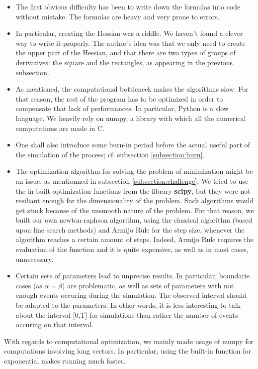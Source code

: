 \begin{itemize}
\item The first obvious difficulty has been to write down the formulas into code without mistake. The formulas are heavy and very prone to errors.
\item In particular, creating the Hessian was a riddle. We haven't found a clever way to write it properly. The author's idea was that we only need to create the upper part of the Hessian, and that there are two types of groups of derivatives: the square and the rectangles, as appearing in the previous subsection.
\item As mentioned, the computational bottleneck makes the algorithms slow. For that reason, the rest of the program has to be optimized in order to compensate that lack of performances. In particular, Python is a slow language. We heavily rely on numpy, a library with which all the numerical computations are made in C.
\item One shall also introduce some burn-in period before the actual useful part of the simulation of the process; cf. subsection \ref{subsection:burn}.
\item The optimization algorithm for solving the problem of minimization might be an issue, as mentionned in subsection \ref{subsection:challenge}. We tried to use the in-built optimization functions from the library \textbf{scipy}, but they were not resiliant enough for the dimensionality of the problem. Such algorithms would get stuck because of the unsmooth nature of the problem. For that reason, we built our own newton-raphson algorithm, using the classical algorithm (based upon line search methods) and Armijo Rule for the step size, whenever the algorithm reaches a certain amount of steps. Indeed, Armijo Rule requires the evaluation of the function and it is quite expensive, as well as in most cases, unnecessary.
\item Certain sets of parameters lead to unprecise results. In particular, boundarie cases (as $\alpha = \beta$) are problematic, as well as sets of parameters with not enough events occuring during the simulation. The observed interval should be adapted to the parameters. In other words, it is less interesting to talk about the interval [0,T] for simulations than rather the number of events occuring on that interval.
\end{itemize}

With regards to computational optimization, we mainly made usage of numpy for computations involving long vectors. In particular, using the built-in function for exponential makes running much faster. 

